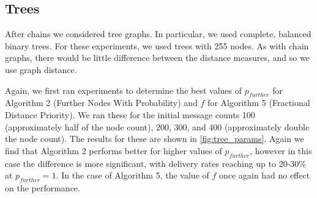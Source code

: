 \documentclass[bsc,frontabs,twoside,singlespacing,parskip,deptreport]{infthesis}     %
\begin{document}
\subsection{Trees}
After chains we considered tree graphs. In particular, we used complete, balanced binary trees. For these experiments, we used trees with 255 nodes. As with chain graphs, there would be little difference between the distance measures, and so we use graph distance.

Again, we first ran experiments to determine the best values of $p_{further}$ for Algorithm 2 (Further Nodes With Probability) and $f$ for Algorithm 5 (Fractional Distance Priority). We ran these for the initial message counts 100 (approximately half of the node count), 200, 300, and 400 (approximately double the node count). The results for these are shown in \ref{fig:tree_params}. Again we find that Algorithm 2 performs better for higher values of $p_{further}$, however in this case the difference is more significant, with delivery rates reaching up to 20-30\% at $p_{further}=1$. In the case of Algorithm 5, the value of $f$ once again had no effect on the performance.
\end{document}
